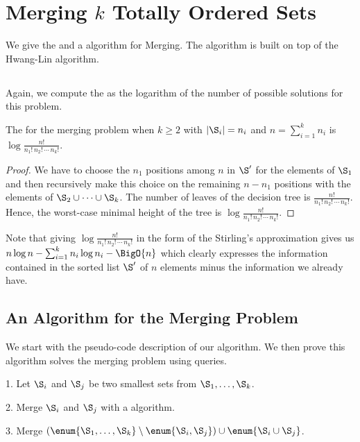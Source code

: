 \section{Merging $k$ Totally Ordered Sets}
\label{tree:merging:kgeq3}

We give the \ITLB and a \BigO{\ITLB} algorithm for Merging. The
algorithm is built on top of the Hwang-Lin algorithm.

\subsection{\ITLB}
\label{tree:merging:kgeq3:ITLB}

Again, we compute the \ITLB as the logarithm of the number of possible solutions
for this problem.
\begin{theorem}
The \ITLB for the merging problem when $k \ge 2$ with $|\S_i| = n_i$ and $n =
\sum_{i=1}^{k} n_i$ is \(\log \frac{n!}{n_1! \, n_2! \, \cdots \, n_k!}\).
\end{theorem}
\begin{proof}
We have to choose the $n_1$ positions among $n$ in $\S'$ for the elements of
$\S_1$ and then recursively make this choice on the remaining $n - n_1$
positions with the elements of \(\S_2 \cup \dots \cup \S_k\). The number of
leaves of the decision tree is $\frac{n!}{n_1! \, n_2! \, \cdots \, n_k!}$. Hence, the
worst-case minimal height of the tree is $\log \frac{n!}{n_1! \, n_2! \, \cdots
\, n_k!}$.
\end{proof}

Note that giving $\log \frac{n!}{n_1! \, n_2! \, \cdots \, n_k!}$ in the form of the
Stirling's approximation gives us \(n \log n - \sum_{i=1}^{k} n_i \log n_i -
\BigO{n}\)
which clearly expresses the information contained in the sorted list $\S'$ of
$n$ elements minus the information we already have.

\subsection{An Algorithm for the Merging Problem}
\label{tree:merging:kgeq3:alg}

We start with the pseudo-code description of our algorithm. We then prove this
algorithm solves the merging problem using \BigO{\ITLB} queries.
\begin{algorithm}
\item[1.] Let \(\S_i\) and \(\S_j\) be two smallest sets from \(\S_1 ,
\dots , \S_k\).
\item[2.] Merge \(\S_i\) and \(\S_j\) with a \BigO{\ITLB} algorithm.
\item[3.] Merge \((\enum{\S_1 , \dots , \S_k} \setminus \enum{\S_i,\S_j} )
\cup \enum{\S_i \cup \S_j}\).
\end{algorithm}


